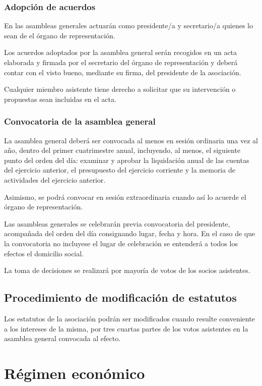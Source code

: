 \documentclass[a4paper, 12pt, oneside]{book}
\begin{document}
\subsection{Adopción de acuerdos}

En las asambleas generales actuarán como presidente/a y secretario/a quienes lo sean de el órgano de representación.

Los acuerdos adoptados por la asamblea general serán recogidos en un acta elaborada y firmada por el secretario del órgano de representación y deberá contar con el visto bueno, mediante su firma, del presidente de la asociación.

Cualquier miembro asistente tiene derecho a solicitar que su intervención o propuestas sean incluidas en el acta.

\subsection{Convocatoria de la asamblea general}

La asamblea general deberá ser convocada al menos en sesión ordinaria una vez al año, dentro del primer cuatrimestre anual, incluyendo, al menos, el siguiente punto del orden del día: examinar y aprobar la liquidación anual de las cuentas del ejercicio anterior, el presupuesto del ejercicio corriente y la memoria de actividades del ejercicio anterior.

Asimismo, se podrá convocar en sesión extraordinaria cuando así lo acuerde el órgano de representación.

Las asambleas generales se celebrarán previa convocatoria del presidente, acompañada del orden del día consignando lugar, fecha y hora. En el caso de que la convocatoria no incluyese el lugar de celebración se entenderá a todos los efectos el domicilio social.

La toma de decisiones se realizará por mayoría de votos de los socios asistentes.

\section{Procedimiento de modificación de estatutos}

Los estatutos de la asociación podrán ser modificados cuando resulte conveniente a los intereses de la misma, por tres cuartas partes de los votos asistentes en la asamblea general convocada al efecto.

\chapter{Régimen económico}
\end{document}
